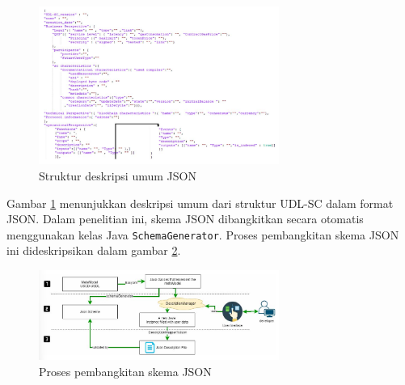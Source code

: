 \begin{figure}[ht]
	\centering
	\includegraphics[width=0.7\textwidth]{resources/chapter-2/json-structure-udl-sc.png}
	\caption{Struktur deskripsi umum JSON \parencite{udlsc}}
	\label{image:json-structure-udl-sc}
\end{figure}

Gambar \ref{image:json-structure-udl-sc} menunjukkan deskripsi umum dari struktur UDL-SC dalam format JSON. Dalam penelitian ini, skema JSON dibangkitkan secara otomatis menggunakan kelas Java \texttt{SchemaGenerator}. Proses pembangkitan skema JSON ini dideskripsikan dalam gambar \ref{image:schema-generation-udl-sc}.

\begin{figure}[ht]
	\centering
	\includegraphics[width=0.7\textwidth]{resources/chapter-2/schema-generation-udl-sc.png}
	\caption{Proses pembangkitan skema JSON \parencite{udlsc}}
	\label{image:schema-generation-udl-sc}
\end{figure}
